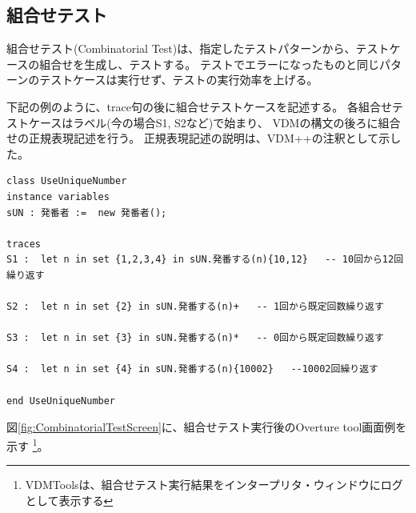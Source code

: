 \subsection{組合せテスト}
	\label{CombinatorialTest}

	組合せテスト(Combinatorial Test)は、指定したテストパターンから、テストケースの組合せを生成し、テストする。
	テストでエラーになったものと同じパターンのテストケースは実行せず、テストの実行効率を上げる。

	下記の例のように、trace句の後に組合せテストケースを記述する。
	各組合せテストケースはラベル(今の場合S1, S2など)で始まり、
	VDMの構文の後ろに組合せの正規表現記述を行う。
	正規表現記述の説明は、VDM++の注釈として示した。

\begin{verbatim}
class UseUniqueNumber
instance variables
sUN : 発番者 :=  new 発番者();

traces
S1 :  let n in set {1,2,3,4} in sUN.発番する(n){10,12}   -- 10回から12回繰り返す

S2 :  let n in set {2} in sUN.発番する(n)+   -- 1回から既定回数繰り返す

S3 :  let n in set {3} in sUN.発番する(n)*   -- 0回から既定回数繰り返す

S4 :  let n in set {4} in sUN.発番する(n){10002}   --10002回繰り返す

end UseUniqueNumber
\end{verbatim}

図\ref{fig:CombinatorialTestScreen}に、組合せテスト実行後のOverture tool画面例を示す
\footnote{VDMToolsは、組合せテスト実行結果をインタープリタ・ウィンドウにログとして表示する}。

